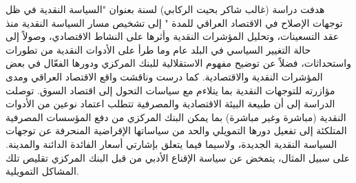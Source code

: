 \documentclass[10pt,a4paper]{report}
\begin{document}
\begin{doublespacing}
هدفت دراسة (غالب شاكر بحيت الركابي) لسنة  بعنوان "السياسة النقدية في ظل توجهات الإصلاح في الاقتصاد العراقي للمدة " إلى تشخيص مسار السياسة النقدية منذ عقد التسعينات، وتحليل المؤشرات النقدية وأثرها على النشاط الاقتصادي، وصولاً إلى حالة التغيير السياسي في البلد عام  وما طرأ على الأدوات النقدية من تطورات واستحداثات، فضلاً عن توضيح مفهوم الاستقلالية للبنك المركزي ودورها الفعّال في بعض المؤشرات النقدية والاقتصادية. كما درست وناقشت واقع الاقتصاد العراقي ومدى مؤازرته للتوجهات النقدية بما يتلاءم مع سياسات التحول إلى اقتصاد السوق. توصلت الدراسة إلى أن طبيعة البيئة الاقتصادية والمصرفية تتطلب اعتماد نوعين من الأدوات النقدية (مباشرة وغير مباشرة) بما يمكن البنك المركزي من دفع المؤسسات المصرفية المتلكئة إلى تفعيل دورها التمويلي والحد من سياساتها الإقراضية المنحرفة عن توجهات السياسة النقدية الجديدة، ولاسيما فيما يتعلق بإشارتي أسعار الفائدة الدائنة والمدينة. على سبيل المثال، يتمخض عن سياسة الإقناع الأدبي من قبل البنك المركزي تقليص تلك المشاكل التمويلية.


\end{doublespacing}
\end{document}
